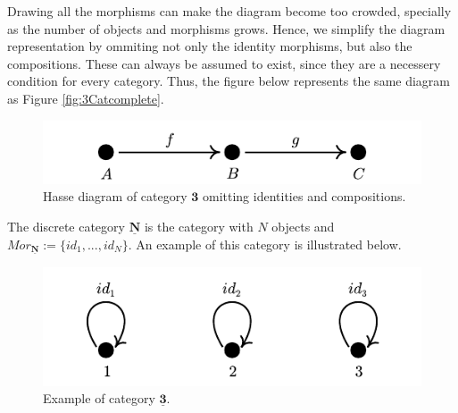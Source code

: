 \begin{example}
	Drawing all the morphisms can make the diagram become too crowded, specially
	as the number of objects and morphisms grows. Hence, we simplify the
	diagram representation by ommiting not only the identity morphisms, but also
	the compositions. These can always be assumed to exist, since they are a necessery
	condition for every category.
	Thus, the figure below represents the same diagram as Figure \ref{fig:3Catcomplete}.

	\begin{figure}[H]
		\begin{center}
			\includegraphics{./notebooks/3Catsimple}
		\end{center}
		\caption{Hasse diagram of category $\bm 3$ omitting identities and compositions.}
		\label{fig:3Catsimple}
	\end{figure}

\end{example}

\begin{example}
	The discrete category $\mathbf{\underline{N}}$ is the category with $N$ objects
	and $Mor_{\mathbf{\underline{N}}} := \{id_1,...,id_N\}$. An example of this category is
	illustrated below.

	\begin{figure}[H]
		\begin{center}
			\includegraphics{./notebooks/3Discrete.pdf}
		\end{center}
		\caption{Example of category $\mathbf{\underline{3}}$.}
		\label{fig:3Discrete}
	\end{figure}
\end{example}

